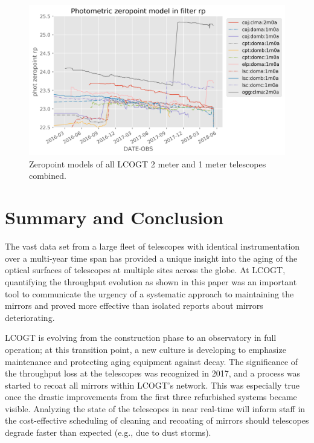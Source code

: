 \documentclass[]{spieman}
\begin{document}
\begin{figure}
\includegraphics[width=\textwidth]{images/allmodels__2m0a_1m0a__rp.png}
\caption{\label{fig_alltelescopes} Zeropoint models of all LCOGT 2 meter and 1 meter telescopes combined. }
\end{figure}






\section{Summary and Conclusion}

The vast data set from a large fleet of telescopes with identical instrumentation over a multi-year
time span has provided a unique insight into the aging of the optical surfaces of telescopes at
multiple sites across the globe. At LCOGT, quantifying the throughput evolution as shown in this
paper was an important tool to communicate the urgency of a systematic approach to maintaining the
mirrors and proved more effective than isolated reports about mirrors deteriorating.

LCOGT is evolving from the construction phase to an observatory in full operation; at this
transition point, a new culture is developing to emphasize maintenance and protecting aging equipment
against decay. The significance of the throughput loss at the telescopes was recognized in 2017, and
a process was started to recoat all mirrors within LCOGT's network.  This was especially true once
the drastic improvements from the first three refurbished systems became visible.  Analyzing the
state of the telescopes in near real-time will inform staff in the cost-effective scheduling of
cleaning and recoating of mirrors should telescopes degrade faster than expected (e.g., due to dust
storms).
\end{document}
